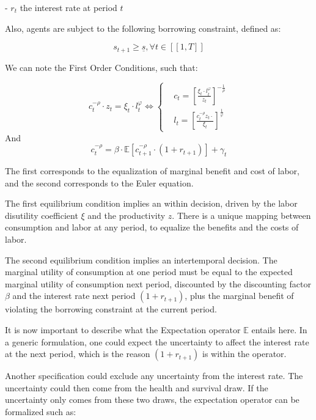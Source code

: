 \documentclass{article}
\begin{document}
-  $r_{t}$ the interest rate at period $t$

Also, agents are subject to the following borrowing constraint, defined as: 

$$s_{t+1}\geq \underline{s}, \forall t \in [\![1,T]\!]$$


We can note the First Order Conditions, such that: 

\begin{equation}
    c^{-\rho}_{t}\cdot z_{t} = \xi_{t}\cdot l_{t}^{\varphi} \iff
        \begin{cases}
        & c_t = \left[\frac{\xi_{t}\cdot l_{t}^{\varphi}}{z_{t}}\right]^{-\frac{1}{\rho}}\\ 
        & l_{t} = \left[\frac{c_{t}^{-\rho}z_{t}\cdot}{\xi_{t}}\right]^{\frac{1}{\varphi}}
    \end{cases}
\end{equation}
And 
\begin{equation}
    c^{-\rho}_{t} = \beta \cdot \mathbb{E}\left[c^{-\rho}_{t+1}\cdot (1+r_{t+1})\right] + \gamma_{t}
\end{equation}

The first corresponds to the equalization of marginal benefit and
cost of labor, and the second corresponds to the Euler equation.

The first equilibrium condition implies an within decision,
driven by the labor disutility coefficient $\xi$ and the productivity $z$.
There is a unique mapping between consumption and labor at any period, to 
equalize the benefits and the costs of labor.

The second equilibrium condition implies an intertemporal decision.
The marginal utility of consumption at one period must be equal to the 
expected marginal utility of consumption next period, discounted by 
the discounting factor $\beta$ and the interest rate next period $(1+r_{t+1})$, 
plus the marginal benefit of violating the borrowing constraint at the current period. 

It is now important to describe what the Expectation operator $\mathbb{E}$ entails here. 
In a generic formulation, one could expect the uncertainty to affect the interest rate at the next period, 
which is the reason $(1+r_{t+1})$ is within the operator.

Another specification could exclude any uncertainty from 
the interest rate. 
The uncertainty could then come from the health and survival draw. 
If the uncertainty only comes from these two draws, the expectation operator can be formalized such as: 
\end{document}
